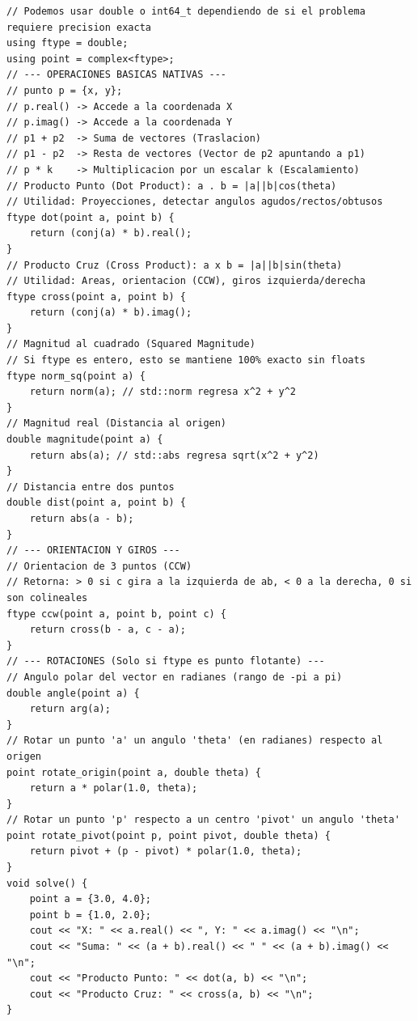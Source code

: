 \documentclass[10pt,landscape,twocolumn]{article}
\begin{document}
\begin{lstlisting}
// Podemos usar double o int64_t dependiendo de si el problema requiere precision exacta
using ftype = double; 
using point = complex<ftype>;
// --- OPERACIONES BASICAS NATIVAS ---
// punto p = {x, y};
// p.real() -> Accede a la coordenada X
// p.imag() -> Accede a la coordenada Y
// p1 + p2  -> Suma de vectores (Traslacion)
// p1 - p2  -> Resta de vectores (Vector de p2 apuntando a p1)
// p * k    -> Multiplicacion por un escalar k (Escalamiento)
// Producto Punto (Dot Product): a . b = |a||b|cos(theta)
// Utilidad: Proyecciones, detectar angulos agudos/rectos/obtusos
ftype dot(point a, point b) {
    return (conj(a) * b).real();
}
// Producto Cruz (Cross Product): a x b = |a||b|sin(theta)
// Utilidad: Areas, orientacion (CCW), giros izquierda/derecha
ftype cross(point a, point b) {
    return (conj(a) * b).imag();
}
// Magnitud al cuadrado (Squared Magnitude)
// Si ftype es entero, esto se mantiene 100% exacto sin floats
ftype norm_sq(point a) {
    return norm(a); // std::norm regresa x^2 + y^2
}
// Magnitud real (Distancia al origen)
double magnitude(point a) {
    return abs(a); // std::abs regresa sqrt(x^2 + y^2)
}
// Distancia entre dos puntos
double dist(point a, point b) {
    return abs(a - b);
}
// --- ORIENTACION Y GIROS ---
// Orientacion de 3 puntos (CCW)
// Retorna: > 0 si c gira a la izquierda de ab, < 0 a la derecha, 0 si son colineales
ftype ccw(point a, point b, point c) {
    return cross(b - a, c - a);
}
// --- ROTACIONES (Solo si ftype es punto flotante) ---
// Angulo polar del vector en radianes (rango de -pi a pi)
double angle(point a) {
    return arg(a);
}
// Rotar un punto 'a' un angulo 'theta' (en radianes) respecto al origen
point rotate_origin(point a, double theta) {
    return a * polar(1.0, theta);
}
// Rotar un punto 'p' respecto a un centro 'pivot' un angulo 'theta'
point rotate_pivot(point p, point pivot, double theta) {
    return pivot + (p - pivot) * polar(1.0, theta);
}
void solve() {
    point a = {3.0, 4.0};
    point b = {1.0, 2.0};
    cout << "X: " << a.real() << ", Y: " << a.imag() << "\n";
    cout << "Suma: " << (a + b).real() << " " << (a + b).imag() << "\n";
    cout << "Producto Punto: " << dot(a, b) << "\n";
    cout << "Producto Cruz: " << cross(a, b) << "\n";
}
\end{lstlisting}
\end{document}
